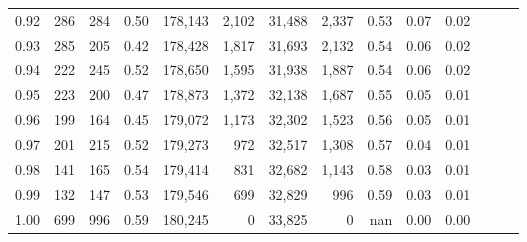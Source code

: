 \begin{tabular}{rrrrrrrrrrrrrr}
0.92 &    286 &  284 &  0.50 &  178,143 &    2,102 &  31,488 &   2,337 &  0.53 &  0.07 &      0.02 \\
0.93 &    285 &  205 &  0.42 &  178,428 &    1,817 &  31,693 &   2,132 &  0.54 &  0.06 &      0.02 \\
0.94 &    222 &  245 &  0.52 &  178,650 &    1,595 &  31,938 &   1,887 &  0.54 &  0.06 &      0.02 \\
0.95 &    223 &  200 &  0.47 &  178,873 &    1,372 &  32,138 &   1,687 &  0.55 &  0.05 &      0.01 \\
0.96 &    199 &  164 &  0.45 &  179,072 &    1,173 &  32,302 &   1,523 &  0.56 &  0.05 &      0.01 \\
0.97 &    201 &  215 &  0.52 &  179,273 &      972 &  32,517 &   1,308 &  0.57 &  0.04 &      0.01 \\
0.98 &    141 &  165 &  0.54 &  179,414 &      831 &  32,682 &   1,143 &  0.58 &  0.03 &      0.01 \\
0.99 &    132 &  147 &  0.53 &  179,546 &      699 &  32,829 &     996 &  0.59 &  0.03 &      0.01 \\
1.00 &    699 &  996 &  0.59 &  180,245 &        0 &  33,825 &       0 &   nan &  0.00 &      0.00 \\
\bottomrule
\end{tabular}
